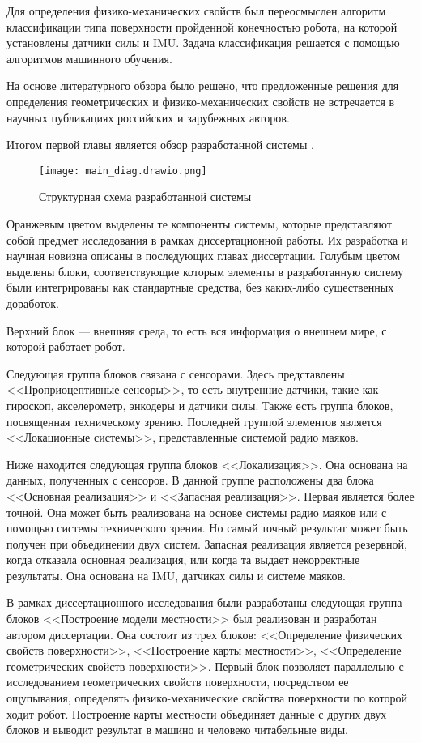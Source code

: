 Для определения физико-механических свойств был переосмыслен алгоритм классификации типа поверхности пройденной конечностью робота, на которой установлены датчики силы и IMU. Задача классификация решается с помощью алгоритмов машинного обучения.  

На основе литературного обзора было решено, что предложенные решения для определения геометрических и физико-механических свойств не встречается в научных публикациях российских и зарубежных авторов.

Итогом первой главы является обзор разработанной системы .
\begin{figure}[ht!]
    \centering\texttt{[image: main\_diag.drawio.png]}
    \caption{Структурная схема разработанной системы}
    \label{fig:diag_system.png}
\end{figure}

Оранжевым цветом выделены те компоненты системы, которые представляют собой предмет исследования в рамках диссертационной работы. Их разработка и научная новизна описаны в последующих главах диссертации. Голубым цветом выделены блоки, соответствующие которым элементы в разработанную систему были интегрированы как стандартные средства,   без каких-либо существенных доработок.

Верхний блок --- внешняя среда, то есть вся информация о внешнем мире, с которой работает робот.

Следующая группа блоков связана с сенсорами. Здесь представлены <<Проприоцептивные сенсоры>>, то есть внутренние датчики, такие как гироскоп, акселерометр, энкодеры и датчики силы. Также есть группа блоков, посвященная техническому зрению. Последней группой элементов является <<Локационные системы>>, представленные системой радио маяков. 

Ниже находится следующая группа блоков <<Локализация>>. Она основана на данных, полученных с сенсоров. В данной группе расположены два блока <<Основная реализация>> и <<Запасная реализация>>. Первая является более точной. Она может быть реализована на основе системы радио маяков или с помощью системы технического зрения. Но самый точный результат может быть получен при объединении двух систем. Запасная реализация является резервной, когда отказала основная реализация, или когда та выдает некорректные результаты. Она основана на IMU, датчиках силы и системе маяков.

В рамках диссертационного исследования были разработаны следующая группа блоков <<Построение модели местности>> был реализован и разработан автором диссертации. Она состоит из трех блоков: <<Определение физических свойств поверхности>>, <<Построение карты местности>>, <<Определение геометрических свойств поверхности>>. Первый блок позволяет параллельно с исследованием геометрических свойств поверхности, посредством ее ощупывания, определять физико-механические свойства поверхности по которой ходит робот. Построение карты местности объединяет данные с других двух блоков и выводит результат в машино и человеко читабельные виды.

